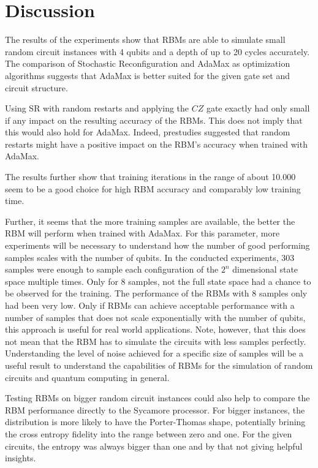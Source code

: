 \chapter{Discussion}

The results of the experiments show that RBMs are able to simulate small random circuit 
instances with 4 qubits and a depth of up to 20 cycles accurately. The comparison of 
Stochastic Reconfiguration and AdaMax as optimization algorithms suggests that 
AdaMax is better suited for the given gate set and circuit structure. 

Using SR with random restarts and applying the $CZ$ gate exactly had only small if any 
impact on the resulting accuracy of the RBMs. This does not imply that this would also 
hold for AdaMax. Indeed, prestudies suggested that random restarts might have a positive 
impact on the RBM's accuracy when trained with AdaMax.

The results further show that training iterations in the range of about 10.000 seem
to be a good choice for high RBM accuracy and comparably low training time.

Further, it seems that the more training samples are available, the better the RBM will 
perform when trained with AdaMax. For this parameter, more experiments will be necessary 
to understand how the number of good performing samples scales with the number of qubits. 
In the conducted experiments, 303 samples were enough to sample each configuration of the 
$2^n$ dimensional state space multiple times. Only for 8  samples, not the full state space
had a chance to be observed for the training. The performance of the RBMs with 8 samples only 
had been very low. Only if RBMs can achieve acceptable performance with a number of samples 
that does not scale exponentially with the number of qubits, this approach is useful for 
real world applications. Note, however, that this does not mean that the RBM has to simulate 
the circuits with less samples perfectly. Understanding the level of noise achieved for 
a specific size of samples will be a useful result to understand the capabilities of RBMs 
for the simulation of random circuits and quantum computing in general.

Testing RBMs on bigger random circuit instances could also help to compare the RBM performance
directly to the Sycamore processor. For bigger instances, the distribution is more likely to 
have the Porter-Thomas shape, potentially brining the cross entropy fidelity into the range between
zero and one. For the given circuits, the entropy was always bigger than one and by that not giving 
helpful insights. 


